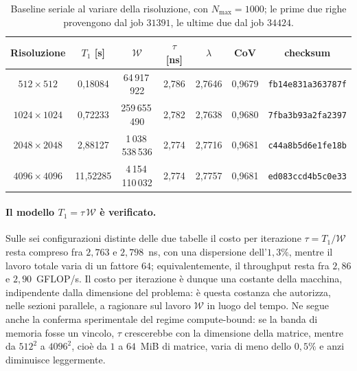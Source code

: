 \begin{table}[H]
    \centering
    \begin{tabular}{ccccccc}
        \hline
        \textbf{Risoluzione} & \textbf{$T_1$} [s] & \textbf{$\mathcal{W}$} & \textbf{$\tau$} [ns] & \textbf{$\lambda$} & \textbf{CoV} & \textbf{checksum}\footnotemark[\value{checksumfootnote}]\\ \hline
        $512 \times 512$   & 0{,}18084  & 64\,917\,922      & 2{,}786 & 2{,}7646 & 0{,}9679 & \texttt{fb14e831a363787f} \\
        $1024 \times 1024$ & 0{,}72233  & 259\,655\,490     & 2{,}782 & 2{,}7638 & 0{,}9680 & \texttt{7fba3b93a2fa2397} \\
        $2048 \times 2048$ & 2{,}88127  & 1\,038\,538\,536  & 2{,}774 & 2{,}7716 & 0{,}9681 & \texttt{c44a8b5d6e1fe18b} \\
        $4096 \times 4096$ & 11{,}52285 & 4\,154\,110\,032  & 2{,}774 & 2{,}7757 & 0{,}9681 & \texttt{ed083ccd4b5c0e33} \\
    \end{tabular}
    \caption{Baseline seriale al variare della risoluzione, con $N_{\max}=1000$; le
    prime due righe provengono dal job $31391$, le ultime due dal job $34424$.}
    \label{tab:serial_var_res}
\end{table}
\vspace{5mm}


\paragraph{Il modello $T_1 = \tau\,\mathcal{W}$ è verificato.}
Sulle sei configurazioni distinte delle due tabelle il costo per iterazione
$\tau = T_1/\mathcal{W}$ resta compreso fra $2{,}763$ e $2{,}798$~ns, con una
dispersione dell'$1{,}3\%$, mentre il lavoro totale varia di un fattore $64$;
equivalentemente, il throughput resta fra $2{,}86$ e $2{,}90$~GFLOP/s. Il costo
per iterazione è dunque una costante della macchina, indipendente dalla
dimensione del problema: è questa costanza che autorizza, nelle sezioni
parallele, a ragionare sul lavoro $\mathcal{W}$ in luogo del tempo. Ne segue
anche la conferma sperimentale del regime compute-bound: se la banda di memoria
fosse un vincolo, $\tau$ crescerebbe con la dimensione della matrice, mentre da
$512^2$ a $4096^2$, cioè da $1$ a $64$~MiB di matrice, varia di meno dello
$0{,}5\%$ e anzi diminuisce leggermente.

